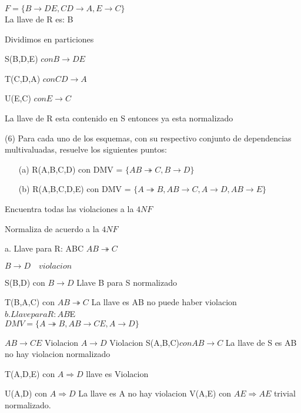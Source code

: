 \documentclass{article}
\begin{document}
     $F=\{B \rightarrow DE, CD \rightarrow A, E \rightarrow C\}$\\

    La llave de R es: B

    Dividimos en particiones

    S(B,D,E) $con B \rightarrow DE$

    T(C,D,A) $con CD \rightarrow A$

    U(E,C) $con E \rightarrow C$

    La llave de R esta contenido en S entonces ya esta normalizado



    \item[(6)] Para cada uno de los esquemas, con su respectivo conjunto de dependencias multivaluadas,
    resuelve los siguientes puntos:
    \begin{enumerate}
      \item[(a)] R(A,B,C,D) con DMV = $ \{ AB \twoheadrightarrow C, B
      \rightarrow D \} $
      \item[(b)] R(A,B,C,D,E) con DMV = $\{ A \twoheadrightarrow B, AB
      \rightarrow C, A \rightarrow D, AB \rightarrow E\}$
    \end{enumerate}
    Encuentra todas las violaciones a la $4NF$

    Normaliza de acuerdo a la $4NF$

    a. Llave para R: ABC
    $AB\twoheadrightarrow C$

    $B\rightarrow D \quad violacion$

    S(B,D) con $B \rightarrow D$ Llave B para S normalizado

    T(B,A,C) con $AB\twoheadrightarrow C$ La llave es AB no puede haber violacion\\
    $b. Llave para R: AB$E\\
    $DMV= \{A \twoheadrightarrow B, AB\rightarrow CE,  A\rightarrow D \}$

    $AB \rightarrow CE$ Violacion
    $A \rightarrow D$ Violacion
    S(A,B,C)$ con AB\rightarrow C$ La llave de S es AB no hay violacion normalizado

    T(A,D,E) con $A\Rightarrow D$ llave es Violacion

    U(A,D) con $A \Rightarrow D$ La llave es A no hay violacion
    V(A,E) con $AE \Rightarrow AE$ trivial normalizado.
\end{document}
